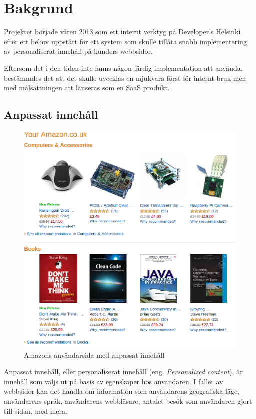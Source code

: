 \section{Bakgrund}

Projektet började våren 2013 som ett internt verktyg på Developer's Helsinki efter ett behov uppstått för ett system som skulle tillåta snabb implementering av personaliserat innehåll på kunders webbsidor.

Eftersom det i den tiden inte fanns någon färdig implementation att använda, bestämmdes det att det skulle uvecklas en mjukvara först för internt bruk men med målsättningen att lanseras som en SaaS produkt.

\subsection{Anpassat innehåll}

\begin{figure}[h!]
\centering
\includegraphics[width=120mm]{assets/images/amazon.png}
\caption{Amazons användarsida med anpassat innehåll}
\label{overflow}
\end{figure}

Anpassat innehåll, eller personaliserat innehåll (eng. \textit{Personalized content}), är innehåll som väljs ut på basis av egenskaper hos användaren. I fallet av webbsidor kan det handla om information som användarens geografiska läge, användarens språk, användarens webbläsare, antalet besök som användaren gjort till sidan, med mera.

